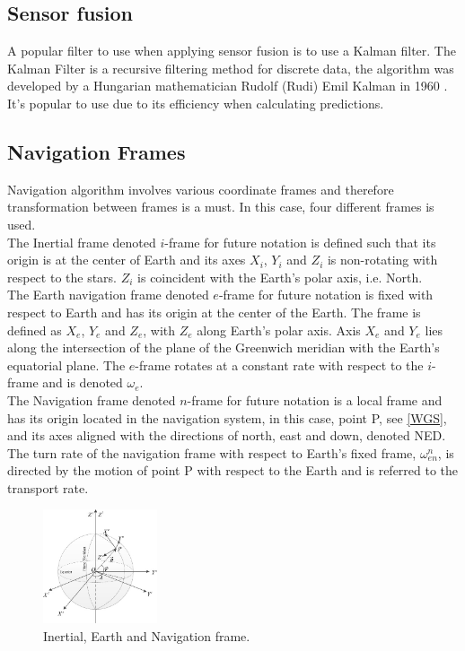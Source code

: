 \subsection{Sensor fusion}
A popular filter to use when applying sensor fusion is to use a Kalman filter. The Kalman Filter is a recursive filtering method for discrete data, the algorithm was developed by a Hungarian mathematician Rudolf (Rudi) Emil Kalman in 1960 \cite{boken}. It's popular to use due to its efficiency when calculating predictions. \cite{kf eff}

\subsection{Navigation Frames}
Navigation algorithm involves various coordinate frames and therefore transformation between frames is a must. In this case, four different frames is used.\\

The Inertial frame denoted $i$-frame for future notation is defined such that its origin is at the center of Earth and its axes $X_i$, $Y_i$ and $Z_i$ is non-rotating with respect to the stars. $Z_i$ is coincident with the Earth's polar axis, i.e. North.\\

The Earth navigation frame denoted $e$-frame for future notation is fixed with respect to Earth and has its origin at the center of the Earth. The frame is defined as $X_e$, $Y_e$ and $Z_e$, with $Z_e$ along Earth's polar axis. Axis $X_e$ and $Y_e$ lies along the intersection of the plane of the Greenwich meridian with the Earth's equatorial plane. The $e$-frame rotates at a constant rate with respect to the $i$-frame and is denoted $\omega_e$.\\

The Navigation frame denoted $n$-frame for future notation is a local frame and has its origin located in the navigation system, in this case, point P, see \autoref{WGS}, and its axes aligned with the directions of north, east and down, denoted NED. The turn rate of the navigation frame with respect to Earth's fixed frame, $\omega_{en}^n$, is directed by the motion of point P with respect to the Earth and is referred to the transport rate.   

\begin{figure}[H]
\centering
\includegraphics[width=0.3\textwidth]{Figures/WGS-coordinates.png}
\caption{Inertial, Earth and Navigation frame.}
\label{WGS}
\end{figure}

